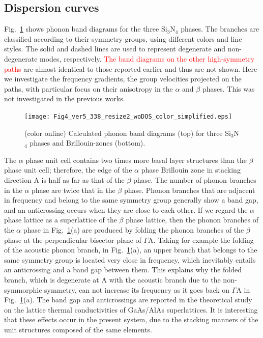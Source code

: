 \documentclass[twocolumn,amsmath,amssymb,a4paper,prb,superscriptaddress,floatfix]{revtex4-1}
\begin{document}
\subsection{Dispersion curves}

Fig.~\ref{fig:Fig4_ver5_338} shows phonon band diagrams for the three
Si$_3$N$_4$ phases. The branches are classified according to their symmetry
groups, using different colors and line styles. The solid and dashed lines are
used to represent degenerate and non-degenerate modes, respectively.
\textcolor{red}{The band diagrams on the other high-symmetry paths} are almost
identical to those reported earlier\cite{kuwabara,xu} and thus are not shown.
Here we investigate the frequency gradients, the group velocities projected on
the paths, with particular focus on their anisotropy in the $\alpha$ and $\beta$
phases. This was not investigated in the previous works.

\begin{figure}[ht]
 \begin{center}
  \texttt{[image: Fig4\_ver5\_338\_resize2\_woDOS\_color\_simplified.eps]}
    \caption{(color online) Calculated phonon band
		      diagrams (top) for three Si$_3$N$_4$ phases and Brillouin-zones (bottom).
  \label{fig:Fig4_ver5_338} }
 \end{center}
\end{figure}

The $\alpha$ phase unit cell contains two times more basal layer
structures than the $\beta$ phase unit cell; therefore, the edge of the $\alpha$ phase
Brillouin zone in stacking direction A is half as far as that of the $\beta$
phase. The number of phonon branches in the $\alpha$ phase are twice 
that in the $\beta$ phase. Phonon branches that are adjacent in
frequency and belong to the same symmetry group generally show a band gap, and an
anticrossing occurs when they are close to each other. If we regard the $\alpha$ phase
lattice as a superlattice of the $\beta$ phase lattice, then the phonon branches
of the $\alpha$ phase in Fig.~\ref{fig:Fig4_ver5_338}(a) are produced by folding
the phonon branches of the $\beta$ phase at the perpendicular bisector plane of
$\Gamma$A. Taking for example the folding of the acoustic phonon branch, in
Fig.~\ref{fig:Fig4_ver5_338}(a), an upper branch that belongs to the same symmetry
group is located very close in frequency, which inevitably entails an anticrossing
and a band gap between them. This explains why the folded branch, which is
degenerate at A with the acoustic branch due to the non-symmorphic symmetry, can
not increase its frequency as it goes back on $\Gamma$A in
Fig.~\ref{fig:Fig4_ver5_338}(a). The band gap and anticrossings  are
reported in the theoretical study on the lattice thermal conductivities of GaAs/AlAs
superlattices.\cite{GaAs/AlAs} It is interesting that these effects occur in the
present system, due to the stacking manners of the unit structures composed of
the same elements.
\end{document}
